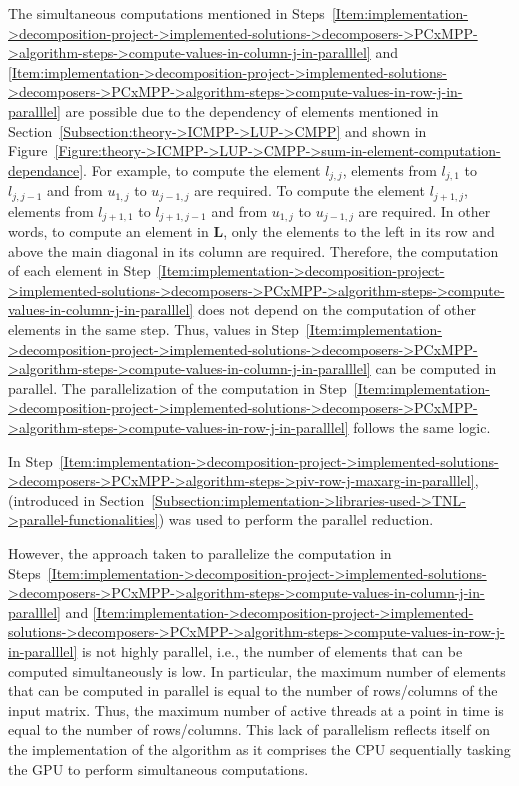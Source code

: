The simultaneous computations mentioned in Steps~\ref{Item:implementation->decomposition-project->implemented-solutions->decomposers->PCxMPP->algorithm-steps->compute-values-in-column-j-in-paralllel} and \ref{Item:implementation->decomposition-project->implemented-solutions->decomposers->PCxMPP->algorithm-steps->compute-values-in-row-j-in-paralllel} are possible due to the dependency of elements mentioned in Section~\ref{Subsection:theory->ICMPP->LUP->CMPP} and shown in Figure~\ref{Figure:theory->ICMPP->LUP->CMPP->sum-in-element-computation-dependance}.
For example, to compute the element $l_{j,j}$, elements from $l_{j,1}$ to $l_{j,j-1}$ and from $u_{1,j}$ to $u_{j-1,j}$ are required.
To compute the element $l_{j+1,j}$, elements from $l_{j+1,1}$ to $l_{j+1,j-1}$ and from $u_{1,j}$ to $u_{j-1,j}$ are required.
In other words, to compute an element in $\mathbf{L}$, only the elements to the left in its row and above the main diagonal in its column are required.
Therefore, the computation of each element in Step~\ref{Item:implementation->decomposition-project->implemented-solutions->decomposers->PCxMPP->algorithm-steps->compute-values-in-column-j-in-paralllel} does not depend on the computation of other elements in the same step.
Thus, values in Step~\ref{Item:implementation->decomposition-project->implemented-solutions->decomposers->PCxMPP->algorithm-steps->compute-values-in-column-j-in-paralllel} can be computed in parallel.
The parallelization of the computation in Step~\ref{Item:implementation->decomposition-project->implemented-solutions->decomposers->PCxMPP->algorithm-steps->compute-values-in-row-j-in-paralllel} follows the same logic.

In Step~\ref{Item:implementation->decomposition-project->implemented-solutions->decomposers->PCxMPP->algorithm-steps->piv-row-j-maxarg-in-paralllel},  (introduced in Section~\ref{Subsection:implementation->libraries-used->TNL->parallel-functionalities}) was used to perform the parallel reduction.

However, the approach taken to parallelize the computation in Steps~\ref{Item:implementation->decomposition-project->implemented-solutions->decomposers->PCxMPP->algorithm-steps->compute-values-in-column-j-in-paralllel} and \ref{Item:implementation->decomposition-project->implemented-solutions->decomposers->PCxMPP->algorithm-steps->compute-values-in-row-j-in-paralllel} is not highly parallel, i.e., the number of elements that can be computed simultaneously is low.
In particular, the maximum number of elements that can be computed in parallel is equal to the number of rows/columns of the input matrix.
Thus, the maximum number of active threads at a point in time is equal to the number of rows/columns.
This lack of parallelism reflects itself on the implementation of the algorithm as it comprises the CPU sequentially tasking the GPU to perform simultaneous computations.

